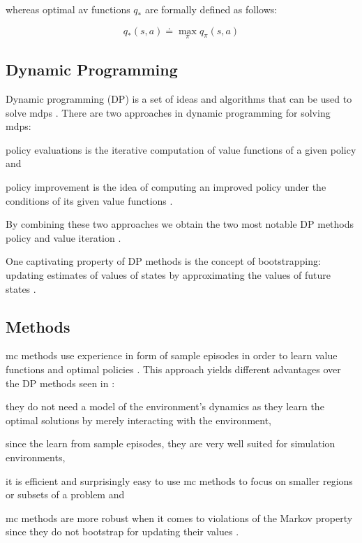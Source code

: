 \documentclass{seal_thesis}
\begin{document}
whereas optimal \gls{av} functions $q_*$ are formally defined as follows:

\begin{equation}
	q_* (s,a) \doteq \max_\pi q_\pi (s,a)
\end{equation}

\subsection{Dynamic Programming}
\label{subsec:dp}

Dynamic programming (DP) is a set of ideas and algorithms that can be used to solve \glspl{mdp} \cite[p. 95]{Sutton2017}. There are two approaches in dynamic programming for solving \glspl{mdp}:
\begin{enumerate*}
	\item policy evaluations is the iterative computation of value functions of a given policy and
	\item policy improvement is the idea of computing an improved policy under the conditions of its given value functions \cite[p. 95]{Sutton2017}.
\end{enumerate*}

By combining these two approaches we obtain the two most notable DP methods \ie policy and value iteration \cite[p. 95]{Sutton2017}.

One captivating property of DP methods is the concept of bootstrapping: updating estimates of values of states by approximating the values of future states \cite[p. 96]{Sutton2017}.

\subsection{ Methods}
\label{subsec:mc}

\gls{mc} methods use experience in form of sample episodes in order to learn value functions and optimal policies \cite[p. 123]{Sutton2017}. This approach yields different advantages over the DP methods seen in :
\begin{enumerate*}
	\item they do not need a model of the environment's dynamics as they learn the optimal solutions by merely interacting with the environment,
	\item since the learn from sample episodes, they are very well suited for simulation environments,
	\item it is efficient and surprisingly easy to use \gls{mc} methods to focus on smaller regions or subsets of a problem and
	\item \gls{mc} methods are more robust when it comes to violations of the Markov property since they do not bootstrap for updating their values \cite[p. 123]{Sutton2017}.
\end{enumerate*}
\end{document}
